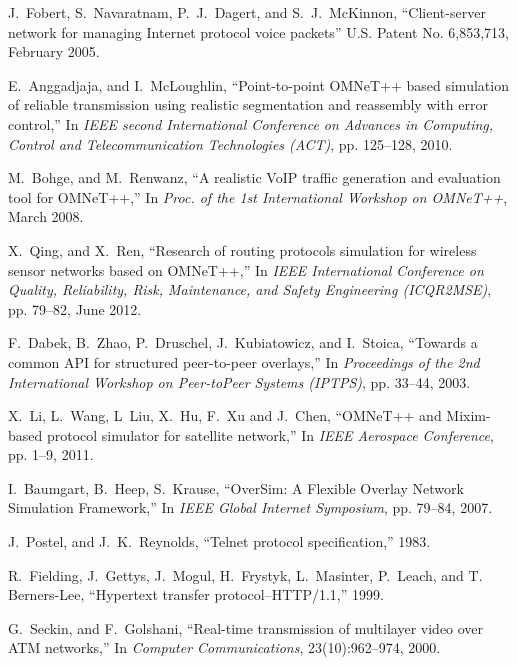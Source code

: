 \documentclass[10pt,conference]{IEEEtran}
\begin{document}
\begin{thebibliography}{10}
J.~Fobert, S.~Navaratnam, P.~J.~Dagert, and S.~J.~McKinnon,
\newblock ``Client-server network for managing Internet protocol
voice packets''
\newblock U.S. Patent No. 6,853,713, February 2005.


E.~Anggadjaja, and I.~McLoughlin,
\newblock ``Point-to-point OMNeT++ based simulation of reliable transmission
using realistic segmentation and reassembly with error control,''
\newblock In {\em IEEE second International Conference on Advances in
Computing, Control and Telecommunication Technologies (ACT)}, pp. 125--128,
2010.

M.~Bohge, and M.~Renwanz,
\newblock ``A realistic VoIP traffic generation and evaluation tool for
OMNeT++,''
\newblock In {\em Proc. of the 1st International Workshop on OMNeT++},
March 2008.

X.~Qing, and X.~Ren,
\newblock ``Research of routing protocols simulation for wireless sensor
networks based on OMNeT++,''
\newblock In {\em IEEE International Conference on Quality, Reliability, Risk,
Maintenance, and Safety Engineering (ICQR2MSE)}, pp. 79--82, June 2012.

F.~Dabek, B.~Zhao, P.~Druschel, J.~Kubiatowicz, and I.~Stoica,
\newblock ``Towards a common API for structured peer-to-peer overlays,''
\newblock In {\em Proceedings of the 2nd International Workshop on Peer-toPeer Systems (IPTPS)}, pp. 33--44, 2003.

X.~Li, L.~Wang, L~Liu, X.~Hu, F.~Xu and J.~Chen,
\newblock ``OMNeT++ and Mixim-based protocol simulator for satellite network,''
\newblock In {\em IEEE Aerospace Conference}, pp. 1--9, 2011.

I.~Baumgart, B.~Heep, S.~Krause,
\newblock ``OverSim: A Flexible Overlay Network Simulation Framework,''
\newblock In {\em IEEE Global Internet Symposium}, pp. 79--84, 2007.

J.~Postel, and J.~K.~Reynolds,
\newblock ``Telnet protocol specification,'' 1983.

R.~Fielding, J.~Gettys, J.~Mogul, H.~Frystyk, L.~Masinter, P.~Leach, and T.~
Berners-Lee,
\newblock ``Hypertext transfer protocol–HTTP/1.1,'' 1999.

G.~Seckin, and F.~Golshani,
\newblock ``Real-time transmission of multilayer video over ATM networks,''
\newblock In {\em Computer Communications}, 23(10):962--974, 2000.


\end{thebibliography}

%
\end{document}
